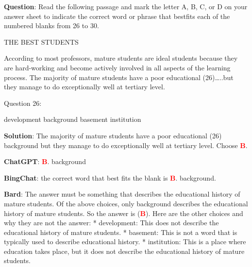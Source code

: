 \documentclass[11pt]{article}
\begin{document}
\begin{mdframed}[linewidth=1pt,linecolor=red] \textbf{Question}: Read the following passage and mark the letter A, B, C, or D on your answer sheet to indicate the correct word or phrase that bestfits each of the numbered blanks from 26 to 30.
	
	THE BEST STUDENTS
	
	According to most professors, mature students are ideal students because they are hard-working and become actively involved in all aspects of the learning process. The majority of mature students have a poor educational (26)…..but they manage to do exceptionally well at tertiary level. 
	 
	Question 26: 
	\begin{choices}
		\choice development 
		\choice background 
		\choice basement 		
		\choice institution
	\end{choices}
	
	\textbf{Solution}: The majority of mature students have a poor educational (26) background but they manage to do exceptionally  well at tertiary level. Choose \textcolor{red}{\textbf{B}}. 
	
	\textbf{ChatGPT}: \textcolor{red}{\textbf{B}}. background
	
	\textbf{BingChat}:  the correct word that best fits the blank is \textcolor{red}{\textbf{B}}. background. 
	
	\textbf{Bard}: The answer must be something that describes the educational history of mature students. Of the above choices, only background describes the educational history of mature students. So the answer is (\textcolor{red}{\textbf{B}}).
	Here are the other choices and why they are not the answer:
	* development: This does not describe the educational history of mature students.
	* basement: This is not a word that is typically used to describe educational history.
	* institution: This is a place where education takes place, but it does not describe the educational history of mature students.
		
\end{mdframed}
\end{document}
